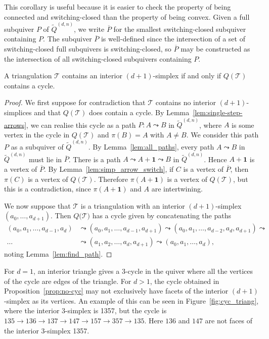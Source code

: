 \documentclass[ALCO,Unicode,published]{cedram}
\newcommand{\onevec}{\mathbf{1}} %
\newcommand{\tqdn}{\tilde{Q}^{(d, n)}}
\begin{document}
This corollary is useful because it is easier to check the property of being connected and switching-closed than the property of being convex. Given a full subquiver $P$ of $\tqdn$, we write $\overline{P}$ for the smallest switching-closed subquiver containing $P$. The subquiver $\overline{P}$ is well-defined since the intersection of a set of switching-closed full subquivers is switching-closed, so $\overline{P}$ may be constructed as the intersection of all switching-closed subquivers containing $P$.

\begin{prop}\label{prop:no-cyc}
A triangulation $\mathcal{T}$ contains an interior $(d+1)$-simplex if and only if $Q(\mathcal{T})$ contains a cycle.
\end{prop}
\begin{proof}
We first suppose for contradiction that $\mathcal{T}$ contains no interior $(d+1)$-simplices and that $Q(\mathcal{T})$ does contain a cycle. By Lemma~\ref{lem:single-step-arrows}, we can realise this cycle as a path $P \colon A \leadsto B$ in $\tqdn$, where $A$ is some vertex in the cycle in $Q(\mathcal{T})$ and $\pi(B) = A$ with $A \neq B$. We consider this path $P$ as a subquiver of $\tqdn$. By Lemma~\ref{lem:all_paths}, every path $A \leadsto B$ in $\tqdn$ must lie in $\overline{P}$. There is a path $A \leadsto A + \onevec \leadsto B$ in $\tqdn$. Hence $A + \onevec$ is a vertex of $\overline{P}$. By Lemma~\ref{lem:simp_arrow_switch}, if $C$ is a vertex of $\overline{P}$, then $\pi(C)$ is a vertex of $Q(\mathcal{T})$. Therefore $\pi(A + \onevec)$ is a vertex of $Q(\mathcal{T})$, but this is a contradiction, since $\pi(A + \onevec)$ and $A$ are intertwining.

We now suppose that $\mathcal{T}$ is a triangulation with an interior $(d + 1)$-simplex  $(a_{0}, \dots, a_{d + 1})$. Then $Q(\mathcal{T)}$ has a cycle given by concatenating the paths
\begin{align*}
(a_{0}, a_{1}, \dots, a_{d - 1}, a_{d}) &\leadsto (a_{0}, a_{1}, \dots , a_{d - 1}, a_{d + 1}) \leadsto (a_{0}, a_{1}, \dots, a_{d - 2}, a_{d}, a_{d + 1}) \leadsto \\
 \dots &\leadsto (a_{1}, a_{2}, \dots, a_{d}, a_{d + 1}) \leadsto (a_{0}, a_{1}, \dots , a_{d}),
\end{align*}
noting Lemma~\ref{lem:find_path}.
\end{proof}

\begin{rema}
For $d = 1$, an interior triangle gives a 3-cycle in the quiver where all the vertices of the cycle are edges of the triangle. For $d > 1$, the cycle obtained in Proposition~\ref{prop:no-cyc} may not exclusively have facets of the interior $(d + 1)$-simplex as its vertices. An example of this can be seen in Figure~\ref{fig:cyc_triang}, where the interior 3-simplex is 1357, but the cycle is $135 \to 136 \to 137 \to 147 \to 157 \to 357 \to 135$. Here $136$ and $147$ are not faces of the interior 3-simplex 1357.
\end{rema}
\end{document}
